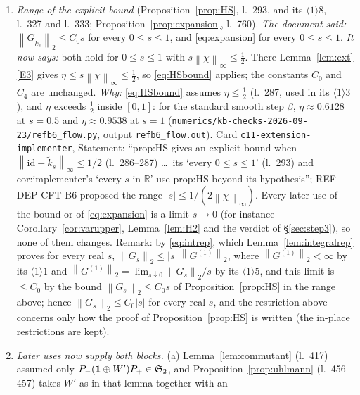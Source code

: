\documentclass[11pt]{article}
\newcommand{\Pp}{P_+}\newcommand{\Pm}{P_-}
\newcommand{\Wt}{\widetilde W}\newcommand{\kt}{\widetilde k}
\newcommand{\norm}[1]{\left\lVert #1\right\rVert}\newcommand{\abs}[1]{\left|#1\right|}
\begin{document}
\begin{enumerate}[label=(C\arabic*),ref=C\arabic*,leftmargin=3em]
 Hilbert--Schmidt by the same argument.''  The steps (the product formula; the hypotheses of
 Proposition~\ref{prop:HS} for either sign of $t$, including $\kt_t'\ge e^{-|t|\Lambda_0}$;
 $n\ge2|s|\norm\chi_\infty$; $\Wt_s^*=\Wt_{-s}$) are those checked by REF-DEP-CFT-B6, B9 and B10.
\item\label{corr0924:C3} \emph{Range of the explicit bound} (Proposition~\ref{prop:HS}, l.~293, and its
 $\langle1\rangle8$, l.~327 and l.~333; Proposition~\ref{prop:expansion}, l.~760).
 \emph{The document said:} $\norm{G_{\kt_s}}_2\le C_0s$ for every $0\le s\le1$, and
 \eqref{eq:expansion} for every $0\le s\le1$.
 \emph{It now says:} both hold for $0\le s\le1$ with $s\norm\chi_\infty\le\frac12$.  There
 Lemma~\ref{lem:ext}\ref{E3} gives $\eta\le s\norm\chi_\infty\le\frac12$, so \eqref{eq:HSbound}
 applies; the constants $C_0$ and $C_4$ are unchanged.
 \emph{Why:} \eqref{eq:HSbound} assumes $\eta\le\frac12$ (l.~287, used in its $\langle1\rangle3$),
 and $\eta$ exceeds $\frac12$ inside $[0,1]$: for the standard smooth step $\beta$,
 $\eta\approx0.6128$ at $s=0.5$ and $\eta\approx0.9538$ at $s=1$
 (\texttt{numerics/kb-checks-2026-09-23/refb6\_flow.py}, output \texttt{refb6\_flow.out}).  Card
 \texttt{c11-extension-implementer}, Statement: ``prop:HS gives an explicit bound when
 $\norm{\mathrm{id}-\kt_s}_\infty\le1/2$ (l.~286--287) \dots\ its `every $0\le s\le1$' (l.~293) and
 cor:implementer's `every $s$ in $\mathbb R$' use prop:HS beyond its hypothesis''; REF-DEP-CFT-B6
 proposed the range $|s|\le1/(2\norm\chi_\infty)$.  Every later use of the bound or of
 \eqref{eq:expansion} is a limit $s\to0$ (for instance Corollary~\ref{cor:varupper},
 Lemma~\ref{lem:H2} and the verdict of \S\ref{sec:step3}), so none of them changes.  Remark: by
 \eqref{eq:intrep}, which Lemma~\ref{lem:integralrep} proves for every real $s$,
 $\norm{G_s}_2\le|s|\,\norm{G^{(1)}}_2$, where $\norm{G^{(1)}}_2<\infty$ by its
 $\langle1\rangle1$ and $\norm{G^{(1)}}_2=\lim_{s\downarrow0}\norm{G_s}_2/s$ by its
 $\langle1\rangle5$, and this limit is $\le C_0$ by the bound $\norm{G_s}_2\le C_0s$ of Proposition~\ref{prop:HS} in the range above; hence $\norm{G_s}_2\le C_0|s|$ for every real $s$, and the restriction above
 concerns only how the proof of Proposition~\ref{prop:HS} is written (the in-place restrictions are
 kept).
\item\label{corr0924:C4} \emph{Later uses now supply both blocks.}
 (a) Lemma~\ref{lem:commutant} (l.~417) assumed only $\Pm(\one\oplus W')\Pp\in\Stwo$, and
 Proposition~\ref{prop:uhlmann} (l.~456--457) takes $W'$ as in that lemma together with an

\end{enumerate}
\end{document}
